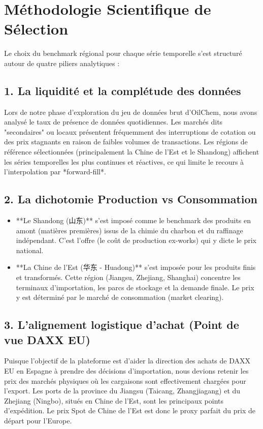 \documentclass[12pt,a4paper]{article}
\begin{document}
\section{Méthodologie Scientifique de Sélection}
Le choix du benchmark régional pour chaque série temporelle s'est structuré autour de quatre piliers analytiques :

\subsection{1. La liquidité et la complétude des données}
Lors de notre phase d'exploration du jeu de données brut d'OilChem, nous avons analysé le taux de présence de données quotidiennes. Les marchés dits "secondaires" ou locaux présentent fréquemment des interruptions de cotation ou des prix stagnants en raison de faibles volumes de transactions. Les régions de référence sélectionnées (principalement la Chine de l'Est et le Shandong) affichent les séries temporelles les plus continues et réactives, ce qui limite le recours à l'interpolation par *forward-fill*.

\subsection{2. La dichotomie Production vs Consommation}
\begin{itemize}
    \item **Le Shandong (山东)** s'est imposé comme le benchmark des produits en amont (matières premières) issus de la chimie du charbon et du raffinage indépendant. C'est l'offre (le coût de production ex-works) qui y dicte le prix national.
    \item **La Chine de l'Est (华东 - Huadong)** s'est imposée pour les produits finis et transformés. Cette région (Jiangsu, Zhejiang, Shanghai) concentre les terminaux d'importation, les parcs de stockage et la demande finale. Le prix y est déterminé par le marché de consommation (market clearing).
\end{itemize}

\subsection{3. L'alignement logistique d'achat (Point de vue DAXX EU)}
Puisque l'objectif de la plateforme est d'aider la direction des achats de DAXX EU en Espagne à prendre des décisions d'importation, nous devions retenir les prix des marchés physiques où les cargaisons sont effectivement chargées pour l'export. Les ports de la province du Jiangsu (Taicang, Zhangjiagang) et du Zhejiang (Ningbo), situés en Chine de l'Est, sont les principaux points d'expédition. Le prix Spot de Chine de l'Est est donc le proxy parfait du prix de départ pour l'Europe.
\end{document}
